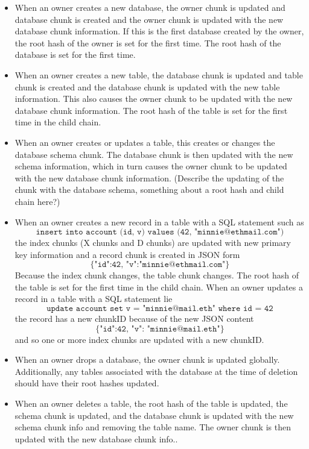\documentclass{article}
\newcommand{\sql}[1]{\texttt{#1}}
\newcommand{\json}[1]{\{\texttt{#1}\}}
\begin{document}
\begin{itemize}
\item When an owner creates a new database, the owner chunk is updated and  database chunk is created and the owner chunk is updated with the new database chunk information. If this is the first database created by the owner, the root hash of the owner is set for the first time. The root hash of the database is set for the first time.
\item When an owner creates a new table, the database chunk is updated and table chunk is created and the database chunk is updated with the new table information.  This also causes the owner chunk to be updated with the new database chunk information.  The root hash of the table is set for the first time in the child chain.
\item When an owner creates or updates a table, this creates or changes the database schema chunk.  The database chunk is then updated with the new schema information, which in turn causes the owner chunk to be updated with the new database chunk information.  (Describe the updating of the chunk with the database schema, something about a root hash and child chain here?)
\item When an owner creates a new record in a table with a SQL statement such as
\[
\sql{insert into account (id, v) values (42, "minnie@ethmail.com")}
\]
the index chunks (X chunks and D chunks) are updated with new primary key information and a record chunk is created in JSON form
\[
\json{{"id":42, "v":"minnie@ethmail.com"}}
\]
Because the index chunk changes, the table chunk changes. The root hash of the table is set for the first time in the child chain.
When an owner updates a record in a table with a SQL statement lie
\[
\sql{update account set v = "minnie@mail.eth" where id = 42}
\]
the record has a new chunkID because of the new JSON content
\[
\json{{"id":42, "v": "minnie@mail.eth"}}
\]
and so one or more index chunks are updated with a new chunkID.
\item When an owner drops a database, the owner chunk is updated globally.  Additionally, any tables associated with the database at the time of deletion should have their root hashes updated.
\item When an owner deletes a table, the root hash of the table is updated, the schema chunk is updated, and the database chunk is updated with the new schema chunk info and removing the table name.  The owner chunk is then updated with the new database chunk info..
\end{itemize}
\end{document}
